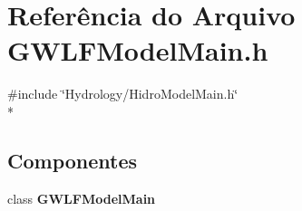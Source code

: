 \section{Referência do Arquivo G\+W\+L\+F\+Model\+Main.\+h}
\label{_g_w_l_f_model_main_8h}
{\ttfamily \#include \char`\"{}Hydrology/\+Hidro\+Model\+Main.\+h\char`\"{}}\\*
\subsection*{Componentes}
\begin{DoxyCompactItemize}
\item 
class {\bf G\+W\+L\+F\+Model\+Main}
\end{DoxyCompactItemize}
